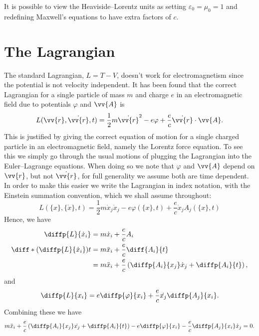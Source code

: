 \documentclass[fleqn]{NotesClass}
\newcommand*{\lagrangian}{L}
\begin{document}
    It is possible to view the Heaviside--Lorentz units as setting \(\varepsilon_0 = \mu_0 = 1\) and redefining Maxwell's equations to have extra factors of \(c\).
    
    \section{The Lagrangian}
    The standard Lagrangian, \(\lagrangian = T - V\), doesn't work for electromagnetism since the potential is not velocity independent.
    It has been found that the correct Lagrangian for a single particle of mass \(m\) and charge \(e\) in an electromagnetic field due to potentials \(\varphi\) and \(\vv{A}\) is
    \begin{equation}
        \lagrangian(\vv{r}, \dot{\vv{r}}, t) = \frac{1}{2}m\dot{\vv{r}}^2 - e\varphi + \frac{e}{c}\dot{\vv{r}}\cdot\vv{A}.
    \end{equation}
    This is justified by giving the correct equation of motion for a single charged particle in an electromagnetic field, namely the Lorentz force equation.
    To see this we simply go through the usual motions of plugging the Lagrangian into the Euler--Lagrange equations.
    When doing so we note that \(\varphi\) and \(\vv{A}\) depend on \(\vv{r}\), but not \(\dot{\vv{r}}\), for full generality we assume both are time dependent.
    In order to make this easier we write the Lagrangian in index notation, with the Einstein summation convention, which we shall assume throughout:
    \begin{equation}
        \lagrangian(\{x\}, \{\dot{x}\}, t) = \frac{1}{2}m\dot{x}_j\dot{x}_j - e\varphi(\{x\}, t) + \frac{e}{c}\dot{x}_jA_j(\{x\}, t)
    \end{equation}
    Hence, we have
    \begin{align}
        \diffp{\lagrangian}{\dot{x}_i} &= m\dot{x}_i + \frac{e}{c}A_i\\ \diff*{\left( \diffp{\lagrangian}{\dot{x}_i} \right)}{t} &= m\ddot{x}_i + \frac{e}{c}\diff{A_i}{t}\\
        &= m\ddot{x}_i + \frac{e}{c}\left( \diffp{A_i}{x_j}\dot{x}_j + \diffp{A_i}{t} \right),
    \end{align}
    and
    \begin{align}
        \diffp{\lagrangian}{x_i} = e\diffp{\varphi}{x_i} + \frac{e}{c}\dot{x_j}\diffp{A_j}{x_i}.
    \end{align}
    Combining these we have
    \begin{equation}
        m\ddot{x}_i + \frac{e}{c}\left( \diffp{A_i}{x_j}\dot{x_j} + \diffp{A_i}{t} \right) - e\diffp{\varphi}{x_i} - \frac{e}{c}\diffp{A_j}{x_i}\dot{x}_j = 0.
    \end{equation}
\end{document}
